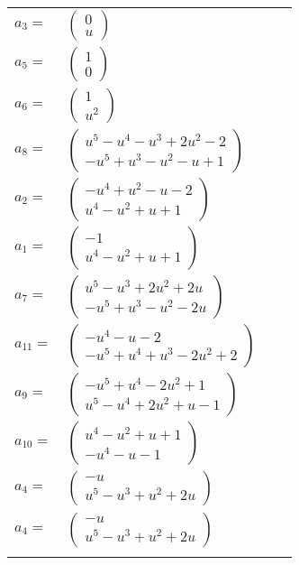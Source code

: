 \documentclass[1p]{elsarticle_modified}
\theoremstyle{definition}
\begin{document}
\begin{tabular}{m{7pt} m{180pt} m{7pt} m{180pt} }
\flushright $a_{3}=$&$\begin{pmatrix}0\\u\end{pmatrix}$ \\
\flushright $a_{5}=$&$\begin{pmatrix}1\\0\end{pmatrix}$ \\
\flushright $a_{6}=$&$\begin{pmatrix}1\\u^2\end{pmatrix}$ \\
\flushright $a_{8}=$&$\begin{pmatrix}u^5- u^4- u^3+2 u^2-2\\- u^5+u^3- u^2- u+1\end{pmatrix}$ \\
\flushright $a_{2}=$&$\begin{pmatrix}- u^4+u^2- u-2\\u^4- u^2+u+1\end{pmatrix}$ \\
\flushright $a_{1}=$&$\begin{pmatrix}-1\\u^4- u^2+u+1\end{pmatrix}$ \\
\flushright $a_{7}=$&$\begin{pmatrix}u^5- u^3+2 u^2+2 u\\- u^5+u^3- u^2-2 u\end{pmatrix}$ \\
\flushright $a_{11}=$&$\begin{pmatrix}- u^4- u-2\\- u^5+u^4+u^3-2 u^2+2\end{pmatrix}$ \\
\flushright $a_{9}=$&$\begin{pmatrix}- u^5+u^4-2 u^2+1\\u^5- u^4+2 u^2+u-1\end{pmatrix}$ \\
\flushright $a_{10}=$&$\begin{pmatrix}u^4- u^2+u+1\\- u^4- u-1\end{pmatrix}$ \\
\flushright $a_{4}=$&$\begin{pmatrix}- u\\u^5- u^3+u^2+2 u\end{pmatrix}$\\ \flushright $a_{4}=$&$\begin{pmatrix}- u\\u^5- u^3+u^2+2 u\end{pmatrix}$\\&\end{tabular}
\end{document}
